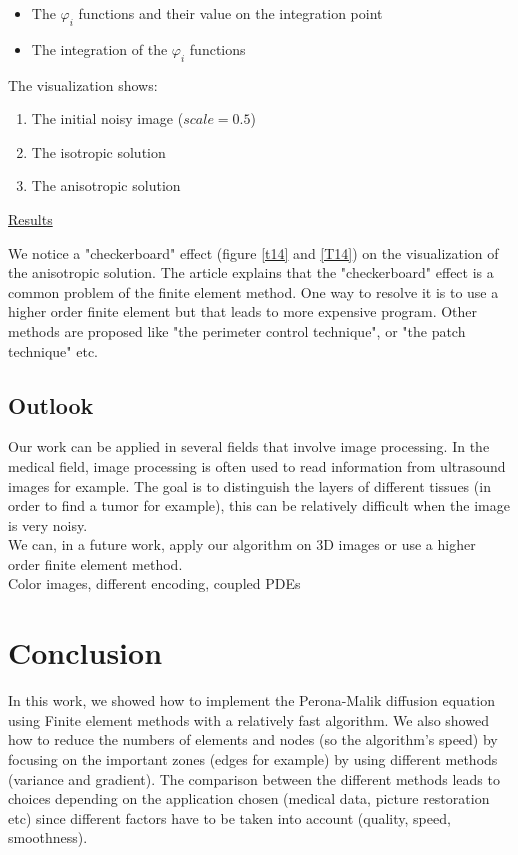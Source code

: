 \documentclass{report}
\renewcommand\phi{\varphi}
\begin{document}
\begin{itemize}
    \item 
    The $\phi_i$ functions and their value on the integration point 
    \item 
    The integration of the $\phi_i$ functions 
    
\end{itemize}

The visualization shows: 
\begin{enumerate}
\item 
The initial noisy image ($scale=0.5$)
\item 
The isotropic solution 
\item 
The anisotropic solution
\end{enumerate}



\underline{Results}

We notice a "checkerboard" effect (figure \ref{t14} and \ref{T14}) on the visualization of the anisotropic solution. The article \cite{shukla2013} explains that the "checkerboard" effect is a common problem of the finite element method. One way to resolve it is to use a higher order finite element but that leads to more expensive program. Other methods are proposed like "the perimeter control technique", or "the patch technique" etc. 



\section{Outlook}

Our work can be applied in several fields that involve image processing. In the medical field, image processing is often used to read information from ultrasound images for example. The goal is to distinguish the layers of different tissues (in order to find a tumor for example), this can be relatively difficult when the image is very noisy. \\

We can, in a future work, apply our algorithm on 3D images or use a higher order finite element method. \\

Color images, different encoding, coupled PDEs

\chapter{Conclusion}

In this work, we showed how to implement the Perona-Malik diffusion equation using Finite element methods with a relatively fast algorithm. We also showed how to reduce the numbers of elements and nodes (so the algorithm's speed) by focusing on the important zones (edges for example) by using different methods (variance and gradient). The comparison between the different methods leads to choices depending on the application chosen (medical data, picture restoration etc) since different factors have to be taken into account (quality, speed, smoothness). 
\end{document}
